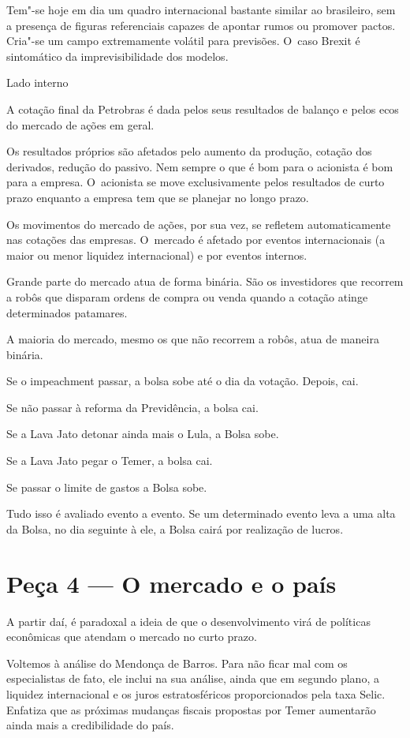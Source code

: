 Tem"-se hoje em dia um quadro internacional bastante similar ao
brasileiro, sem a presença de figuras referenciais capazes de apontar
rumos ou promover pactos. Cria"-se um campo extremamente volátil para
previsões. O~caso Brexit é sintomático da imprevisibilidade dos modelos.

Lado interno

A cotação final da Petrobras é dada pelos seus resultados de balanço e
pelos ecos do mercado de ações em geral.

Os resultados próprios são afetados pelo aumento da produção, cotação
dos derivados, redução do passivo. Nem sempre o que é bom para o
acionista é bom para a empresa. O~acionista se move exclusivamente pelos
resultados de curto prazo enquanto a empresa tem que se planejar no
longo prazo.

Os movimentos do mercado de ações, por sua vez, se refletem
automaticamente nas cotações das empresas. O~mercado é afetado por
eventos internacionais (a maior ou menor liquidez internacional) e por
eventos internos.

Grande parte do mercado atua de forma binária. São os investidores que
recorrem a robôs que disparam ordens de compra ou venda quando a cotação
atinge determinados patamares.

A maioria do mercado, mesmo os que não recorrem a robôs, atua de maneira
binária.

Se o impeachment passar, a bolsa sobe até o dia da votação. Depois, cai.

Se não passar à reforma da Previdência, a bolsa cai.

Se a Lava Jato detonar ainda mais o Lula, a Bolsa sobe.

Se a Lava Jato pegar o Temer, a bolsa cai.

Se passar o limite de gastos a Bolsa sobe.

Tudo isso é avaliado evento a evento. Se um determinado evento leva a
uma alta da Bolsa, no dia seguinte à ele, a Bolsa cairá por realização
de lucros.

\section{Peça 4 --- O mercado e o país}

A partir daí, é paradoxal a ideia de que o desenvolvimento virá de
políticas econômicas que atendam o mercado no curto prazo.

Voltemos à análise do Mendonça de Barros. Para não ficar mal com os
especialistas de fato, ele inclui na sua análise, ainda que em segundo
plano, a liquidez internacional e os juros estratosféricos
proporcionados pela taxa Selic. Enfatiza que as próximas mudanças
fiscais propostas por Temer aumentarão ainda mais a credibilidade do
país.


